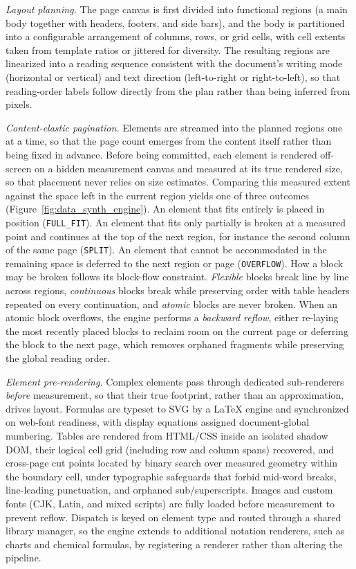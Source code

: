 \textit{Layout planning.} The page canvas is first divided into functional regions (a main body together with headers, footers, and side bars), and the body is partitioned into a configurable arrangement of columns, rows, or grid cells, with cell extents taken from template ratios or jittered for diversity. The resulting regions are linearized into a reading sequence consistent with the document's writing mode (horizontal or vertical) and text direction (left-to-right or right-to-left), so that reading-order labels follow directly from the plan rather than being inferred from pixels.

\textit{Content-elastic pagination.} Elements are streamed into the planned regions one at a time, so that the page count emerges from the content itself rather than being fixed in advance. Before being committed, each element is rendered off-screen on a hidden measurement canvas and measured at its true rendered size, so that placement never relies on size estimates. Comparing this measured extent against the space left in the current region yields one of three outcomes (Figure~\ref{fig:data_synth_engine}). An element that fits entirely is placed in position (\texttt{FULL\_FIT}). An element that fits only partially is broken at a measured point and continues at the top of the next region, for instance the second column of the same page (\texttt{SPLIT}). An element that cannot be accommodated in the remaining space is deferred to the next region or page (\texttt{OVERFLOW}). How a block may be broken follows its block-flow constraint. \emph{Flexible} blocks break line by line across regions, \emph{continuous} blocks break while preserving order with table headers repeated on every continuation, and \emph{atomic} blocks are never broken. When an atomic block overflows, the engine performs a \emph{backward reflow}, either re-laying the most recently placed blocks to reclaim room on the current page or deferring the block to the next page, which removes orphaned fragments while preserving the global reading order.

\textit{Element pre-rendering.} Complex elements pass through dedicated sub-renderers \emph{before} measurement, so that their true footprint, rather than an approximation, drives layout. Formulas are typeset to SVG by a LaTeX engine and synchronized on web-font readiness, with display equations assigned document-global numbering. Tables are rendered from HTML/CSS inside an isolated shadow DOM, their logical cell grid (including row and column spans) recovered, and cross-page cut points located by binary search over measured geometry within the boundary cell, under typographic safeguards that forbid mid-word breaks, line-leading punctuation, and orphaned sub/superscripts. Images and custom fonts (CJK, Latin, and mixed scripts) are fully loaded before measurement to prevent reflow. Dispatch is keyed on element type and routed through a shared library manager, so the engine extends to additional notation renderers, such as charts and chemical formulas, by registering a renderer rather than altering the pipeline.

